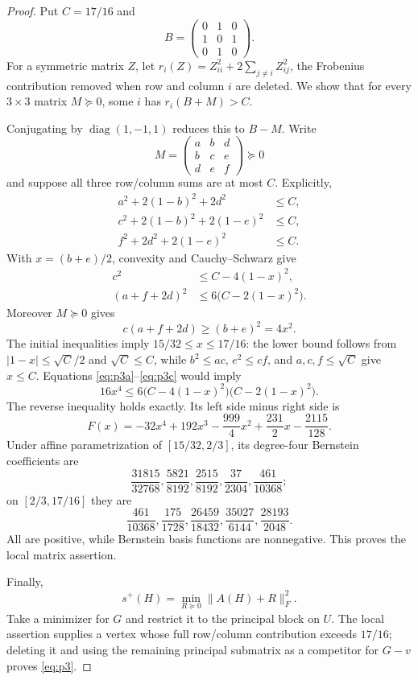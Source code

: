 \documentclass[11pt]{article}
\begin{document}
\begin{proof}
Put $C=17/16$ and
\[
B=\begin{pmatrix}0&1&0\\1&0&1\\0&1&0\end{pmatrix}.
\]
For a symmetric matrix $Z$, let
$r_i(Z)=Z_{ii}^2+2\sum_{j\ne i}Z_{ij}^2$, the Frobenius contribution removed
when row and column $i$ are deleted.  We show that for every
$3\times3$ matrix $M\succeq0$, some $i$ has $r_i(B+M)>C$.

Conjugating by $\operatorname{diag}(1,-1,1)$ reduces this to $B-M$.  Write
\[
M=\begin{pmatrix}a&b&d\\b&c&e\\d&e&f\end{pmatrix}\succeq0
\]
and suppose all three row/column sums are at most $C$.  Explicitly,
\begin{align*}
a^2+2(1-b)^2+2d^2&\le C,\\
c^2+2(1-b)^2+2(1-e)^2&\le C,\\
f^2+2d^2+2(1-e)^2&\le C.
\end{align*}
With $x=(b+e)/2$, convexity and Cauchy--Schwarz give
\begin{align}
c^2&\le C-4(1-x)^2,\label{eq:p3a}\\
(a+f+2d)^2&\le6\bigl(C-2(1-x)^2\bigr).\label{eq:p3b}
\end{align}
Moreover $M\succeq0$ gives
\begin{equation}\label{eq:p3c}
c(a+f+2d)\ge(b+e)^2=4x^2.
\end{equation}
The initial inequalities imply $15/32\le x\le17/16$: the lower bound follows
from $|1-x|\le\sqrt C/2$ and $\sqrt C\le C$, while $b^2\le ac$,
$e^2\le cf$, and $a,c,f\le\sqrt C$ give $x\le C$.
Equations \eqref{eq:p3a}--\eqref{eq:p3c} would imply
\[
16x^4\le6\bigl(C-4(1-x)^2\bigr)\bigl(C-2(1-x)^2\bigr).
\]
The reverse inequality holds exactly.  Its left side minus right side is
\[
F(x)=-32x^4+192x^3-\frac{999}{4}x^2
+\frac{231}{2}x-\frac{2115}{128}.
\]
Under affine parametrization of $[15/32,2/3]$, its degree-four Bernstein
coefficients are
\[
\frac{31815}{32768},\frac{5821}{8192},\frac{2515}{8192},
\frac{37}{2304},\frac{461}{10368};
\]
on $[2/3,17/16]$ they are
\[
\frac{461}{10368},\frac{175}{1728},\frac{26459}{18432},
\frac{35027}{6144},\frac{28193}{2048}.
\]
All are positive, while Bernstein basis functions are nonnegative.  This
proves the local matrix assertion.

Finally,
\[
s^+(H)=\min_{R\succeq0}\|A(H)+R\|_F^2.
\]
Take a minimizer for $G$ and restrict it to the principal block on $U$.  The
local assertion supplies a vertex whose full row/column contribution exceeds
$17/16$; deleting it and using the remaining principal submatrix as a
competitor for $G-v$ proves \eqref{eq:p3}.
\end{proof}
\end{document}
